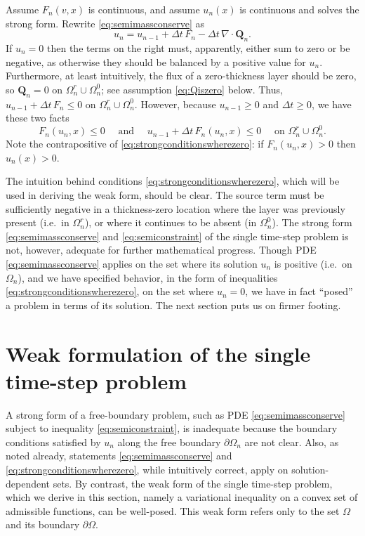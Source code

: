 \documentclass[final,leqno,onefignum,onetabnum]{siamltex1213bueler}
\newcommand\bQ{\mathbf{Q}}
\newcommand{\Div}{\nabla\cdot}
\begin{document}
Assume $F_n(v,x)$ is continuous, and assume $u_n(x)$ is continuous and solves the strong form.  Rewrite \eqref{eq:semimassconserve} as
    $$u_n = u_{n-1} + \Delta t\, F_n - \Delta t\, \Div \bQ_n.$$
If $u_n=0$ then the terms on the right must, apparently, either sum to zero or be negative, as otherwise they should be balanced by a positive value for $u_n$.  Furthermore, at least intuitively, the flux of a zero-thickness layer should be zero, so $\bQ_n=0$ on $\Omega_n^r \cup \Omega_n^0$; see assumption \eqref{eq:Qiszero} below.  Thus, $u_{n-1}+\Delta t\, F_n \le 0$ on $\Omega_n^r \cup \Omega_n^0$.  However, because $u_{n-1}\ge 0$ and $\Delta t\ge 0$, we have these two facts
\begin{equation}
F_n(u_n,x) \le 0 \quad \text{ and } \quad u_{n-1} + \Delta t\, F_n(u_n,x) \le 0 \quad \text{ on } \Omega_n^r \cup \Omega_n^0. \label{eq:strongconditionswherezero}
\end{equation}
Note the contrapositive of \eqref{eq:strongconditionswherezero}: if $F_n(u_n,x)>0$ then $u_n(x)>0$.

The intuition behind conditions \eqref{eq:strongconditionswherezero}, which will be used in deriving the weak form, should be clear.  The source term must be sufficiently negative in a thickness-zero location where the layer was previously present (i.e.~in $\Omega_n^r$), or where it continues to be absent (in $\Omega_n^0$).  The strong form \eqref{eq:semimassconserve} and \eqref{eq:semiconstraint} of the single time-step problem is not, however, adequate for further mathematical progress.  Though PDE \eqref{eq:semimassconserve} applies on the set where its solution $u_n$ is positive (i.e.~on $\Omega_n$), and we have specified behavior, in the form of inequalities \eqref{eq:strongconditionswherezero}, on the set where $u_n=0$, we have in fact ``posed'' a problem in terms of its solution.  The next section puts us on firmer footing.


\section{Weak formulation of the single time-step problem}  \label{sec:weakform}

A strong form of a free-boundary problem, such as PDE \eqref{eq:semimassconserve} subject to inequality \eqref{eq:semiconstraint}, is inadequate because the boundary conditions satisfied by $u_n$ along the free boundary $\partial\Omega_n$ are not clear.  Also, as noted already, statements \eqref{eq:semimassconserve} and \eqref{eq:strongconditionswherezero}, while intuitively correct, apply on solution-dependent sets.  By contrast, the weak form of the single time-step problem, which we derive in this section, namely a variational inequality \cite{Friedman1982,KinderlehrerStampacchia1980} on a convex set of admissible functions, can be well-posed.  This weak form refers only to the set $\Omega$ and its boundary $\partial\Omega$.
\end{document}
